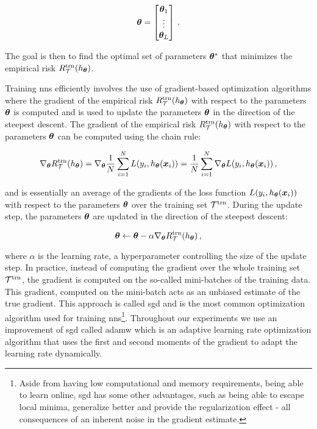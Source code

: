 \begin{equation}
    {\ensuremath{\boldsymbol{\theta}}} = \begin{bmatrix}
        {\ensuremath{\boldsymbol{\theta}}}_1 \\
        \vdots      \\
        {\boldsymbol{\theta}}_L
    \end{bmatrix}\,.
\end{equation}

The goal is then to find the optimal set of parameters ${\boldsymbol{\theta}}^*$ that minimizes the empirical risk $R_\mathcal{T}^\text{trn}(h_{{\boldsymbol{\theta}}})$.

Training \glspl{nn} efficiently involves the use of gradient-based optimization algorithms where the gradient of the
empirical risk $R_\mathcal{T}^\text{trn}(h_{{\boldsymbol{\theta}}})$ with respect to the parameters ${\boldsymbol{\theta}}$ is computed and is used to update the
parameters ${\boldsymbol{\theta}}$ in the direction of the steepest descent. The gradient of the empirical risk
$R_\mathcal{T}^\text{trn}(h_{{\boldsymbol{\theta}}})$ with respect to the parameters ${\boldsymbol{\theta}}$ can be computed using the chain rule:

\begin{equation}
    \nabla_{{\boldsymbol{\theta}}} R_\mathcal{T}^\text{trn}(h_{{\boldsymbol{\theta}}}) = \nabla_{{\boldsymbol{\theta}}} \frac{1}{N} \sum_{i=1}^{N} L(y_i, h_{{\boldsymbol{\theta}}}(\bm{x}_i)) = \frac{1}{N} \sum_{i=1}^{N} \nabla_{{\boldsymbol{\theta}}} L(y_i, h_{{\boldsymbol{\theta}}}(\bm{x}_i))\,,
\end{equation}

and is essentially an average of the gradients of the loss function $L(y_i, h_{{\boldsymbol{\theta}}}(\bm{x}_i))$ with respect to the
parameters ${\boldsymbol{\theta}}$ over the training set $\mathcal{T}^\text{trn}$. During the update step, the parameters ${\boldsymbol{\theta}}$ are updated in the
direction of the steepest descent:

\begin{equation}
    {\ensuremath{\boldsymbol{\theta}}} \leftarrow {\ensuremath{\boldsymbol{\theta}}} - \alpha \nabla_{{\boldsymbol{\theta}}} R_\mathcal{T}^\text{trn}(h_{{\boldsymbol{\theta}}})\,,
\end{equation}

where $\alpha$ is the learning rate, a hyperparameter controlling the size of the update step. In practice,
instead of computing the gradient over the whole training set $\mathcal{T}^\text{trn}$, the gradient is computed on the so-called
mini-batches of the training data. This gradient, computed on the mini-batch acts as an unbiased estimate of the true
gradient. This approach is called \gls{sgd} and is the most common optimization algorithm used for training
\glspl{nn}\footnote{Aside from having low computational and
    memory requirements, being able to learn online, \gls{sgd} has some other advantages, such as being able to escape
    local minima, generalize better and provide the regularization effect - all consequences of an inherent noise in the
    gradient estimate.}.
Throughout our experiments we use an improvement of \gls{sgd} called \gls{adamw} \cite{adam, adamw} which is an adaptive
learning rate optimization algorithm that uses the first and second moments of the gradient to adapt the learning rate
dynamically.

